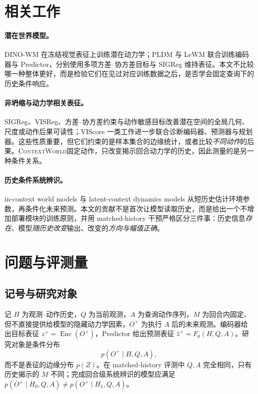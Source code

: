 \documentclass[UTF8,zihao=-4,fontset=fandol]{ctexart}
\newcommand{\benchmark}{\textsc{ContextWorld}}
\begin{document}
\section{相关工作}

\paragraph{潜在世界模型。}
DINO-WM 在冻结视觉表征上训练潜在动力学；PLDM 与 LeWM 联合训练编码器与 Predictor，分别使用多项方差--协方差目标与 SIGReg 维持表征。本文不比较哪一种整体更好，而是检验它们在见过对应训练数据之后，是否学会固定查询下的历史条件响应。

\paragraph{非坍缩与动力学相关表征。}
SIGReg、VISReg、方差--协方差约束与动作敏感目标改善潜在空间的全局几何、尺度或动作后果可读性；VIScore 一类工作进一步联合诊断编码器、预测器与规划器。这些性质重要，但它们约束的是样本集合的边缘统计，或者比较\emph{不同动作}的后果。\benchmark 固定动作，只改变揭示回合动力学的历史，因此测量的是另一种条件关系。

\paragraph{历史条件系统辨识。}
in-context world models 与 latent-context dynamics models 从短历史估计环境参数，再条件化未来预测。本文的贡献不是首次让模型读取历史，而是给出一个不增加部署模块的训练原则，并用 matched-history 干预严格区分三件事：历史信息\emph{存在}、模型\emph{随历史改变}输出、改变的\emph{方向与幅值正确}。


\section{问题与评测量}
\label{sec:problem}

\subsection{记号与研究对象}

记 $H$ 为观测--动作历史，$Q$ 为当前观测，$A$ 为查询动作序列，$M$ 为回合内固定、但不直接提供给模型的隐藏动力学因素，$O^+$ 为执行 $A$ 后的未来观测。编码器给出目标表征 $z^+=\operatorname{Enc}(O^+)$，Predictor 给出预测表征 $\hat z^+=F_\theta(H,Q,A)$。研究对象是条件分布
\begin{equation}
  p(O^+\mid H,Q,A),
\end{equation}
而不是表征的边缘分布 $p(Z)$。在 matched-history 评测中 $Q,A$ 完全相同，只有历史揭示的 $M$ 不同；完成回合级系统辨识的模型应满足 $p(O^+\mid H_0,Q,A)\neq p(O^+\mid H_1,Q,A)$。
\end{document}
